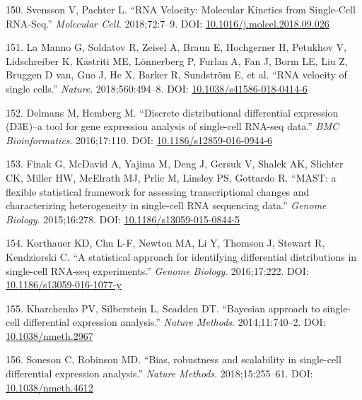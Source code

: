 \documentclass[11pt,a4paper,titlepage,twoside,openright]{style/unimelbthesis}
\theoremstyle{definition}
\theoremstyle{definition}
\theoremstyle{definition}
\theoremstyle{remark}
\begin{document}
\begin{mainmatter}
\leavevmode\hypertarget{ref-Svensson2018-lu}{}%
150. Svensson V, Pachter L. ``RNA Velocity: Molecular Kinetics from Single-Cell RNA-Seq.'' \emph{Molecular Cell}. 2018;72:7--9. DOI: \href{https://doi.org/10.1016/j.molcel.2018.09.026}{10.1016/j.molcel.2018.09.026}

\leavevmode\hypertarget{ref-La_Manno2018-tv}{}%
151. La Manno G, Soldatov R, Zeisel A, Braun E, Hochgerner H, Petukhov V, Lidschreiber K, Kastriti ME, Lönnerberg P, Furlan A, Fan J, Borm LE, Liu Z, Bruggen D van, Guo J, He X, Barker R, Sundström E, et al. ``RNA velocity of single cells.'' \emph{Nature}. 2018;560:494--8. DOI: \href{https://doi.org/10.1038/s41586-018-0414-6}{10.1038/s41586-018-0414-6}

\leavevmode\hypertarget{ref-Delmans2016-bp}{}%
152. Delmans M, Hemberg M. ``Discrete distributional differential expression (D3E)--a tool for gene expression analysis of single-cell RNA-seq data.'' \emph{BMC Bioinformatics}. 2016;17:110. DOI: \href{https://doi.org/10.1186/s12859-016-0944-6}{10.1186/s12859-016-0944-6}

\leavevmode\hypertarget{ref-Finak2015-ow}{}%
153. Finak G, McDavid A, Yajima M, Deng J, Gersuk V, Shalek AK, Slichter CK, Miller HW, McElrath MJ, Prlic M, Linsley PS, Gottardo R. ``MAST: a flexible statistical framework for assessing transcriptional changes and characterizing heterogeneity in single-cell RNA sequencing data.'' \emph{Genome Biology}. 2015;16:278. DOI: \href{https://doi.org/10.1186/s13059-015-0844-5}{10.1186/s13059-015-0844-5}

\leavevmode\hypertarget{ref-Korthauer2016-yq}{}%
154. Korthauer KD, Chu L-F, Newton MA, Li Y, Thomson J, Stewart R, Kendziorski C. ``A statistical approach for identifying differential distributions in single-cell RNA-seq experiments.'' \emph{Genome Biology}. 2016;17:222. DOI: \href{https://doi.org/10.1186/s13059-016-1077-y}{10.1186/s13059-016-1077-y}

\leavevmode\hypertarget{ref-Kharchenko2014-tb}{}%
155. Kharchenko PV, Silberstein L, Scadden DT. ``Bayesian approach to single-cell differential expression analysis.'' \emph{Nature Methods}. 2014;11:740--2. DOI: \href{https://doi.org/10.1038/nmeth.2967}{10.1038/nmeth.2967}

\leavevmode\hypertarget{ref-Soneson2018-fb}{}%
156. Soneson C, Robinson MD. ``Bias, robustness and scalability in single-cell differential expression analysis.'' \emph{Nature Methods}. 2018;15:255--61. DOI: \href{https://doi.org/10.1038/nmeth.4612}{10.1038/nmeth.4612}


\end{mainmatter}
\end{document}
